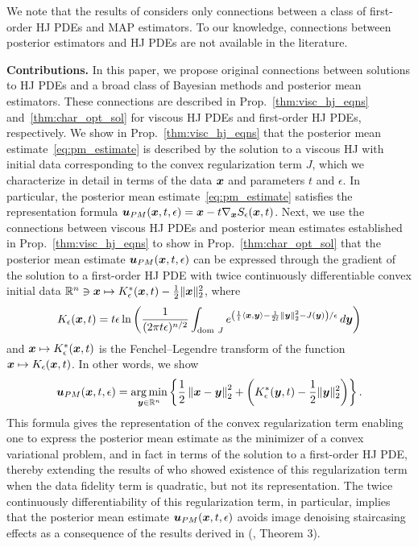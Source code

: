 We note that the results of \cite{darbon2015convex,darbon2019decomposition} considers only connections between a class of first-order HJ PDEs and MAP estimators. To our knowledge, connections between posterior estimators and HJ PDEs are not available in the literature.

\bigbreak
\noindent
\textbf{Contributions.} 
In this paper, we propose original connections between solutions to HJ PDEs and a broad class of Bayesian methods and posterior mean estimators. These connections are described in Prop.~\ref{thm:visc_hj_eqns} and~\ref{thm:char_opt_sol} for viscous HJ PDEs and first-order HJ PDEs, respectively. We show in Prop.~\ref{thm:visc_hj_eqns} that the posterior mean estimate~\eqref{eq:pm_estimate} is described by the solution to a viscous HJ with initial data corresponding to the convex regularization term $J$, which we characterize in detail in terms of the data $\boldsymbol{x}$ and parameters $t$ and $\epsilon$. In particular, the posterior mean estimate~\eqref{eq:pm_estimate} satisfies the representation formula $\boldsymbol{u}_{PM}(\boldsymbol{x},t,\epsilon) = \boldsymbol{x} - t\nabla_{\boldsymbol{x}}S_\epsilon(\boldsymbol{x},t)$. Next, we use the connections between viscous HJ PDEs and posterior mean estimates established in Prop.~\ref{thm:visc_hj_eqns} to show in Prop.~\ref{thm:char_opt_sol} that the posterior mean estimate $\boldsymbol{u}_{PM}(\boldsymbol{x},t,\epsilon)$ can be expressed through the gradient of the solution to a first-order HJ PDE with twice continuously differentiable convex initial data $\mathbb{R}^n \ni \boldsymbol{x} \mapsto K^{*}_{\epsilon}(\boldsymbol{x},t)-\frac{1}{2}\Vert \boldsymbol{x} \Vert_{2}^{2}$, where
\[
K_{\epsilon}(\boldsymbol{x},t) = t\epsilon\ln\left(\frac{1}{(2\pi t\epsilon)^{n/2}}\int_{\mathrm{dom~} J}e^{\left(\frac{1}{t}\left\langle \boldsymbol{x},\boldsymbol{y}\right\rangle -\frac{1}{2t}\left\Vert \boldsymbol{y}\right\Vert _{2}^{2}-J(\boldsymbol{y})\right)/\epsilon}\mathop{}\!d\boldsymbol{y}\right)
\]
and $\boldsymbol{x} \mapsto  K^{*}_{\epsilon}(\boldsymbol{x},t)$ is the Fenchel--Legendre transform of the function $\boldsymbol{x} \mapsto K_{\epsilon}(\boldsymbol{x},t)$. In other words, we show
\[
\boldsymbol{u}_{PM}(\boldsymbol{x},t,\epsilon) = \operatorname*{arg\,min}_{\boldsymbol{y} \in \mathbb{R}^n}\left\{\frac{1}{2}\left\Vert{\boldsymbol{x}-\boldsymbol{y}} \right\Vert_{2}^{2} + \left( K^{*}_{\epsilon}(\boldsymbol{y},t)-\frac{1}{2}\Vert \boldsymbol{y} \Vert_{2}^{2}\right)\right\}.
\]
This formula gives the representation of the convex regularization term enabling one to express the posterior mean estimate as the minimizer of a convex variational problem, and in fact in terms of the solution to a first-order HJ PDE, thereby extending the results of \cite{louchet2008modeles,gribonval2011should} who showed existence of this regularization term when the data fidelity term is quadratic, but not its representation. The twice continuously differentiability of this regularization term, in particular, implies that the posterior mean estimate $\boldsymbol{u}_{PM}(\boldsymbol{x},t,\epsilon)$ avoids image denoising staircasing effects as a consequence of the results derived in (\cite{nikolova2004weakly}, Theorem 3).

